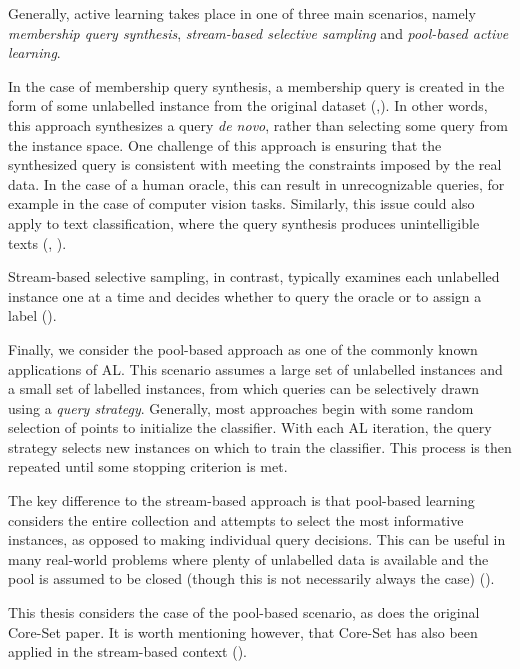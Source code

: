 \documentclass[english,bachelor,ul]{webisthesis} %
\begin{document}
Generally, active learning takes place in one of three main scenarios, namely \textit{membership query synthesis}, \textit{stream-based selective sampling} and \textit{pool-based active learning}. 

In the case of membership query synthesis, a membership query is created in the form of some unlabelled instance from the original dataset (\cite{DBLP:journals/ml/Angluin87},\cite{DBLP:journals/ijon/WangHYL15}). In other words, this approach synthesizes a query \textit{de novo}, rather than selecting some query from the instance space. One challenge of this approach is ensuring that the synthesized query is consistent with meeting the constraints imposed by the real data. In the case of a human oracle, this can result in unrecognizable queries, for example in the case of computer vision tasks. Similarly, this issue could also apply to text classification, where the query synthesis produces unintelligible texts (\cite{langbaum92}, \cite{settles.tr09}).%

Stream-based selective sampling, in contrast, typically examines each unlabelled instance one at a time and decides whether to query the oracle or to assign a label (\cite{settles.tr09}).

Finally, we consider the pool-based approach as one of the commonly known applications of AL. This scenario assumes a large set of unlabelled instances and a small set of labelled instances, from which queries can be selectively drawn using a \textit{query strategy}. Generally, most approaches begin with some random selection of points to initialize the classifier. With each AL iteration, the query strategy selects new instances on which to train the classifier. This process is then repeated until some stopping criterion is met. 

The key difference to the stream-based approach is that pool-based learning considers the entire collection and attempts to select the most informative instances, as opposed to making individual query decisions. This can be useful in many real-world problems where plenty of unlabelled data is available and the pool is assumed to be closed (though this is not necessarily always the case) (\cite{settles.tr09}).

This thesis considers the case of the pool-based scenario, as does the original Core-Set paper. It is worth mentioning however, that Core-Set has also been applied in the stream-based context (\cite{DBLP:conf/icml/SaranYK0A23}).
\end{document}
